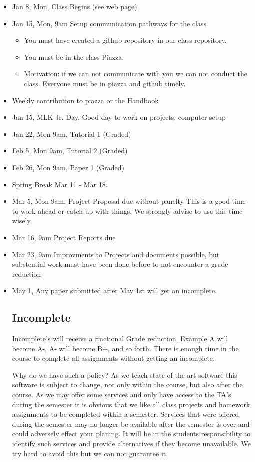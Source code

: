 \begin{itemize}
\item
  Jan 8, Mon, Class Begins (see web page)
  \item
  Jan 15, Mon, 9am Setup communication pathways for the class 

  \begin{itemize}
  \item You must have created a github repository in our class
    repository.
  \item You must be in the class Piazza.
  \item Motivation: if we can not communicate with
    you we can not conduct the class. Everyone must be in piazza and
    github timely.  
  \end{itemize}
\item Weekly contribution to piazza or the Handbook
\item Jan 15, MLK Jr. Day. Good day to work on projects, computer setup
\item Jan 22, Mon 9am, Tutorial 1 (Graded)
\item Feb 5,  Mon 9am, Tutorial 2 (Graded)
\item Feb 26, Mon 9am,  Paper 1 (Graded)
\item Spring Break Mar 11 - Mar 18.  
\item Mar 5, Mon 9am, Project Proposal due without panelty
  This is a good time to work ahead or catch up with things. We strongly
  advise to use this time wisely.
\item Mar 16, 9am Project Reports due
\item Mar 23, 9am Improvments to Projects and documents possible, but
  substential work must have been done before to not encounter a grade reduction
\item May 1, Any paper submitted after May 1st will get an
  incomplete. 

\subsection{Incomplete}\label{incomplete}

Incomplete's will receive a fractional Grade reduction. Example A will
become A-, A- will become B+, and so forth. There is enough time in the
course to complete all assignments without getting an incomplete.

Why do we have such a policy? As we teach state-of-the-art software this
software is subject to change, not only within the course, but also
after the course. As we may offer some services and only have access to
the TA's during the semester it is obvious that we like all class
projects and homework assignments to be completed within a semester.
Services that were offered during the semester may no longer be
available after the semester is over and could adversely effect your
planing. It will be in the students responsibility to identify such
services and provide alternatives if they become unavailable. We try
hard to avoid this but we can not guarantee it.


\end{itemize}
